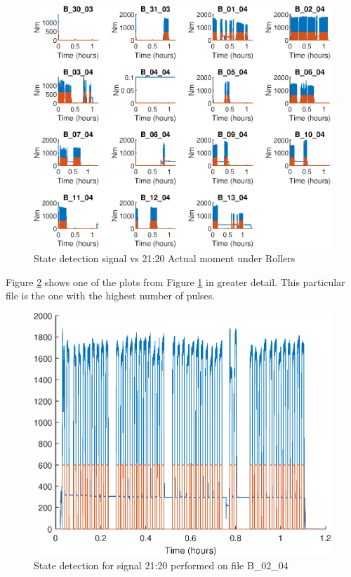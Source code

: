\documentclass{article}
\begin{document}
\begin{figure}[H]
    \centering
    \includegraphics[width=\textwidth, height=\textheight, keepaspectratio]{figures/StateDetectionFig.eps}
    \caption{State detection signal vs 21:20 Actual moment under Rollers}
    \label{fig:StateDetection}
\end{figure}

Figure \ref{fig:StateDetectionFig_B_02_04} shows one of the plots from Figure \ref{fig:StateDetection} in greater detail. This particular file is the one with the highest number of pulses.

\begin{figure}[H]
    \centering
    \includegraphics[width=\textwidth, height=\textheight, keepaspectratio]{figures/StateDetectionFig_B_02_04.eps}
    \caption{State detection for signal 21:20 performed on file B\_02\_04}
    \label{fig:StateDetectionFig_B_02_04}
\end{figure}
\end{document}
